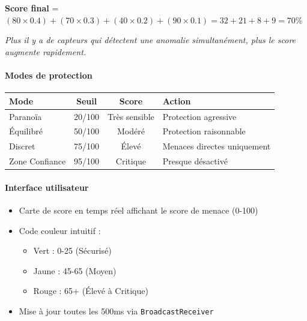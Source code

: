 \documentclass[11pt,a4paper]{article}
\begin{document}
\textbf{Score final} = $(80 \times 0.4) + (70 \times 0.3) + (40 \times 0.2) + (90 \times 0.1) = 32 + 21 + 8 + 9 = 70\%$

\vspace{2mm}
\noindent\textit{Plus il y a de capteurs qui détectent une anomalie simultanément, plus le score augmente rapidement.}

\paragraph{Modes de protection}
\begin{center}
\begin{tabular}{lccl}
\toprule
\textbf{Mode} & \textbf{Seuil} & \textbf{Score} & \textbf{Action}\\
\midrule
Paranoïa & 20/100 & Très sensible & Protection agressive\\
Équilibré & 50/100 & Modéré & Protection raisonnable\\
Discret & 75/100 & Élevé & Menaces directes uniquement\\
Zone Confiance & 95/100 & Critique & Presque désactivé\\
\bottomrule
\end{tabular}
\end{center}

\paragraph{Interface utilisateur}
\begin{itemize}
    \item Carte de score en temps réel affichant le score de menace (0-100)
    \item Code couleur intuitif :
    \begin{itemize}
        \item Vert : 0-25 (Sécurisé)
        \item Jaune : 45-65 (Moyen)
        \item Rouge : 65+ (Élevé à Critique)
    \end{itemize}
    \item Mise à jour toutes les 500ms via \texttt{BroadcastReceiver}
\end{itemize}
\end{document}
